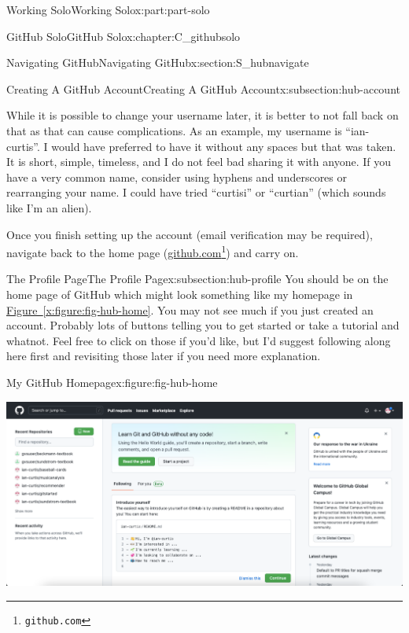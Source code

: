 \documentclass[oneside,10pt,]{book}
\newcommand{\xreffont}{\relax}
\begin{document}
\begin{partptx}{Working Solo}{}{Working Solo}{}{}{x:part:part-solo}
\begin{chapterptx}{GitHub Solo}{}{GitHub Solo}{}{}{x:chapter:C_githubsolo}
\begin{sectionptx}{Navigating GitHub}{}{Navigating GitHub}{}{}{x:section:S_hubnavigate}
\begin{subsectionptx}{Creating A GitHub Account}{}{Creating A GitHub Account}{}{}{x:subsection:hub-account}
\begin{enumerate}
\begin{itemize}[label=\textbullet]
\end{itemize}
While it is possible to change your username later, it is better to not fall back on that as that can cause complications. As an example, my username is ``ian-curtis''. I would have preferred to have it without any spaces but that was taken. It is short, simple, timeless, and I do not feel bad sharing it with anyone. If you have a very common name, consider using hyphens and underscores or rearranging your name. I could have tried ``curtisi'' or ``curtian'' (which sounds like I'm an alien).%
\end{enumerate}
%
\par
Once you finish setting up the account (email verification may be required), navigate back to the home page (\href{https://github.com}{github.com}\footnote{\nolinkurl{github.com}\label{g:fn:idm480361848}}) and carry on.%
\end{subsectionptx}
%
%
\typeout{************************************************}
\typeout{************************************************}
%
\begin{subsectionptx}{The Profile Page}{}{The Profile Page}{}{}{x:subsection:hub-profile}
%
%
%
%
%
You should be on the home page of GitHub which might look something like my homepage in \hyperref[x:figure:fig-hub-home]{Figure~{\xreffont\ref{x:figure:fig-hub-home}}}. You may not see much if you just created an account. Probably lots of buttons telling you to get started or take a tutorial and whatnot. Feel free to click on those if you'd like, but I'd suggest following along here first and revisiting those later if you need more explanation.%
\begin{figureptx}{My GitHub Homepage}{x:figure:fig-hub-home}{}%
\begin{image}{0.05}{0.9}{0.05}%
\includegraphics[width=\linewidth]{external/hub_home.pdf}

\end{image}
\end{figureptx}
\end{subsectionptx}
\end{sectionptx}
\end{chapterptx}
\end{partptx}
\end{document}
